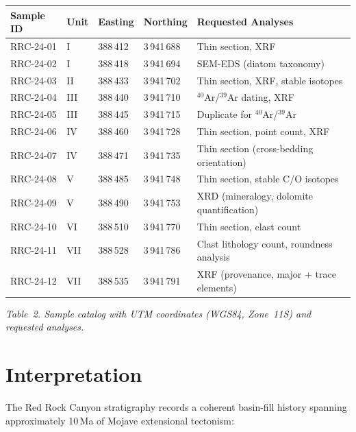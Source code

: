 \documentclass[11pt,a4paper]{article}
\begin{document}
\begin{tabularx}{\linewidth}{@{} l l l l >{\raggedright\arraybackslash}X @{}}
\toprule
\textbf{Sample ID} & \textbf{Unit} & \textbf{Easting} & \textbf{Northing} & \textbf{Requested Analyses} \\
\midrule
RRC-24-01 & I   & 388\,412 & 3\,941\,688 & Thin section, XRF \\
RRC-24-02 & I   & 388\,418 & 3\,941\,694 & SEM-EDS (diatom taxonomy) \\
RRC-24-03 & II  & 388\,433 & 3\,941\,702 & Thin section, XRF, stable isotopes \\
RRC-24-04 & III & 388\,440 & 3\,941\,710 & $^{40}$Ar/$^{39}$Ar dating, XRF \\
RRC-24-05 & III & 388\,445 & 3\,941\,715 & Duplicate for $^{40}$Ar/$^{39}$Ar \\
RRC-24-06 & IV  & 388\,460 & 3\,941\,728 & Thin section, point count, XRF \\
RRC-24-07 & IV  & 388\,471 & 3\,941\,735 & Thin section (cross-bedding orientation) \\
RRC-24-08 & V   & 388\,485 & 3\,941\,748 & Thin section, stable C/O isotopes \\
RRC-24-09 & V   & 388\,490 & 3\,941\,753 & XRD (mineralogy, dolomite quantification) \\
RRC-24-10 & VI  & 388\,510 & 3\,941\,770 & Thin section, clast count \\
RRC-24-11 & VII & 388\,528 & 3\,941\,786 & Clast lithology count, roundness analysis \\
RRC-24-12 & VII & 388\,535 & 3\,941\,791 & XRF (provenance, major + trace elements) \\
\bottomrule
\end{tabularx}
\vspace{3pt}
{\small\itshape\color{stone}Table~2. Sample catalog with UTM coordinates (WGS84, Zone~11S) and requested analyses.}

\section{Interpretation}

The Red Rock Canyon stratigraphy records a coherent basin-fill history spanning
approximately 10\,Ma of Mojave extensional tectonism:
\end{document}
